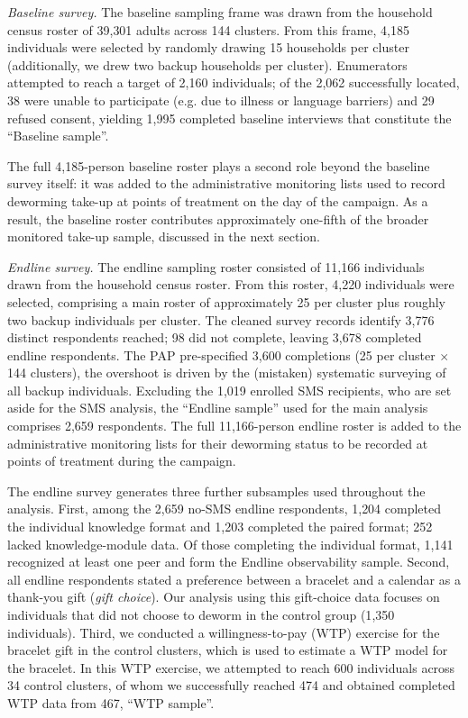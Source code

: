 
\emph{Baseline survey.} The baseline sampling frame was drawn from the household
census roster of 39{,}301 adults across 144 clusters.  From this frame, 4{,}185
individuals were selected by randomly drawing 15 households per cluster (additionally, we drew two backup 
households per cluster).  Enumerators attempted to reach a
target of 2{,}160 individuals; of the 2{,}062 successfully located, 38 were
unable to participate (e.g. due to illness or language barriers) and 29
refused consent, yielding 1{,}995 completed baseline interviews that
constitute the ``Baseline sample''.

The full 4{,}185-person baseline roster plays a second role beyond the baseline
survey itself: it was added to the administrative monitoring lists used to
record deworming take-up at points of treatment on the day of the campaign.  As
a result, the baseline roster contributes approximately one-fifth of the broader
monitored take-up sample, discussed in the next section.


\emph{Endline survey.} The endline sampling roster consisted of 11{,}166
individuals drawn from the household census roster.  From this roster, 4{,}220
individuals were selected, comprising a main roster of approximately 25 per
cluster plus roughly two backup individuals per cluster. The cleaned survey
records identify 3{,}776 distinct respondents reached; 98 did not complete,
leaving 3{,}678 completed endline respondents.  The PAP pre-specified 3{,}600 completions (25 per cluster $\times$
144 clusters), the overshoot is driven by the (mistaken) systematic surveying of
all backup individuals. Excluding the 1{,}019 enrolled SMS recipients, who are set aside for
the SMS analysis, the ``Endline sample'' used for the main analysis comprises
2{,}659 respondents.  The full 11{,}166-person endline roster is added to the
administrative monitoring lists for their deworming status to be recorded at
points of treatment during the campaign.


The endline survey generates three further subsamples used throughout the
analysis. First, among the 2{,}659 no-SMS endline respondents, 1{,}204 completed
 the individual knowledge format and 1{,}203 completed the paired format;
252 lacked knowledge-module data. Of those completing the individual format,
1{,}141 recognized at least one peer and form the Endline observability sample.
Second, all endline respondents stated a preference between a
bracelet and a calendar as a thank-you gift (\emph{gift choice}).  Our analysis 
using this gift-choice data focuses on individuals that did not choose to deworm
in the control group (1{,}350 individuals). Third, we conducted a
willingness-to-pay (WTP) exercise for the bracelet gift in the control clusters,
which is used to estimate a WTP model for the bracelet.  In this WTP exercise,
we attempted to reach 600 individuals across 34 control clusters, of whom we
successfully reached 474 and obtained completed WTP data from 467, ``WTP sample''.


